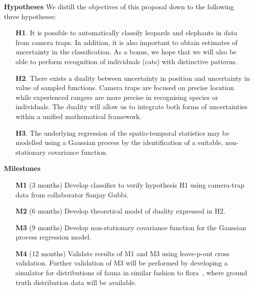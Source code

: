 \documentclass[a4paper,10pt,twocolumn]{article}
\newcommand{\hdg}[1] {\noindent \textbf{#1} }
\begin{document}
\hdg{Hypotheses}
We distill the objectives of this proposal down to the following three hypotheses:
\begin{itemize}[topsep=-2.1ex,itemsep=-.7ex,leftmargin=1ex,itemindent=3ex]
 \item [\textbf{H1}.] It is possible to automatically classify leopards and elephants in data from camera traps. In addition, it is also important to obtain estimates of uncertainty in the classification. As a bonus, we hope that we will also be able to perform recognition of individuals (cats) with distinctive patterns.
 \item [\textbf{H2}.] There exists a duality between uncertainty in position and uncertainty in value of sampled functions. Camera traps are focused on precise location while experienced rangers are more precise in recognising species or individuals. The duality will allow us to integrate both forms of uncertainties within a unified mathematical framework.
 \item [\textbf{H3}.] The underlying regression of the spatio-temporal statistics may be modelled using a Gaussian process by the identification of a suitable, non-stationary covariance function.
\end{itemize}
\vspace{2.5ex}
% 

\hdg{Milestones}
\begin{enumerate} [topsep=-1ex,itemsep=-.1ex,leftmargin=1ex,itemindent=3ex]
 \item [\textbf{M1}] (3  months) Develop classifier to verify hypothesis H1 using camera-trap data from collaborator Sanjay Gubbi.
 \item [\textbf{M2}] (6  months) Develop theoretical model of duality expressed in H2.
 \item [\textbf{M3}] (9 months) Develop non-stationary covariance function for the Gaussian process regression model.
 \item [\textbf{M4}] (12 months) Validate results of M1 and M3 using leave-p-out cross validation. Further validation of M3 will be performed by developing a simulator for distributions of fauna in similar fashion to flora~\cite{Bradbury15Guided}, where ground truth distribution data will be available.
 \end{enumerate}
\vspace{2.5ex}
\end{document}
